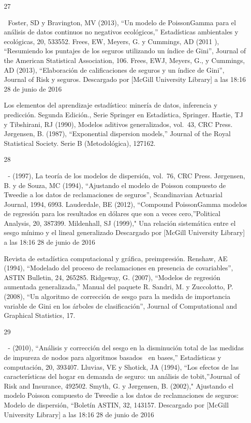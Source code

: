\documentclass[]{article}
\begin{document}
27

 Foster, SD y Bravington, MV (2013), ``Un modelo de PoissonGamma para
el análisis de datos continuos no negativos ecológicos,'' Estadísticas
ambientales y ecológicas, 20, 533552. Frees, EW, Meyers, G. y Cummings,
AD (2011 ), ``Resumiendo los puntajes de los seguros utilizando un
índice de Gini'', Journal of the American Statistical Association, 106.
Frees, EWJ, Meyers, G., y Cummings, AD (2013), ``Elaboración de
calificaciones de seguros y un índice de Gini'', Journal of Risk y
seguros. Descargado por {[}McGill University Library{]} a las 18:16 28
de junio de 2016

Los elementos del aprendizaje estadístico: minería de datos, inferencia
y predicción. Segunda Edición., Serie Springer en Estadística, Springer.
Hastie, TJ y Tibshirani, RJ (1990), Modelos aditivos generalizados,
vol.~43, CRC Press. Jørgensen, B. (1987), ``Exponential dispersion
models,'' Journal of the Royal Statistical Society. Serie B
(Metodológica), 127162.

28

 - (1997), La teoría de los modelos de dispersión, vol.~76, CRC Press.
Jørgensen, B. y de Souza, MC (1994), ``Ajustando el modelo de Poisson
compuesto de Tweedie a los datos de reclamaciones de seguros'',
Scandinavian Actuarial Journal, 1994, 6993. Lauderdale, BE (2012),
``Compound PoissonGamma modelos de regresión para los resultados en
dólares que son a veces cero,''Political Analysis, 20, 387399.
Mildenhall, SJ (1999)," Una relación sistemática entre el sesgo mínimo y
el lineal generalizado Descargado por {[}McGill University Library{]} a
las 18:16 28 de junio de 2016

Revista de estadística computacional y gráfica, preimpresión. Renshaw,
AE (1994), ``Modelado del proceso de reclamaciones en presencia de
covariables'', ASTIN Bulletin, 24, 265285. Ridgeway, G. (2007),
``Modelos de regresión aumentada generalizada,'' Manual del paquete R.
Sandri, M. y Zuccolotto, P. (2008), ``Un algoritmo de corrección de
sesgo para la medida de importancia variable de Gini en los árboles de
clasificación'', Journal of Computational and Graphical Statistics, 17.

29

 - (2010), ``Análisis y corrección del sesgo en la disminución total de
las medidas de impureza de nodos para algoritmos basados en bases,''
Estadísticas y computación, 20, 393407. Lluvias, VE y Shotick, JA
(1994), ``Los efectos de las características del hogar en demanda de
seguro: un análisis de tobit,''Journal of Risk and Insurance, 492502.
Smyth, G. y Jørgensen, B. (2002)," Ajustando el modelo Poisson compuesto
de Tweedie a los datos de reclamaciones de seguros: Modelo de
dispersión, ``Boletín ASTIN, 32, 143157. Descargado por {[}McGill
University Library{]} a las 18:16 28 de junio de 2016
\end{document}
